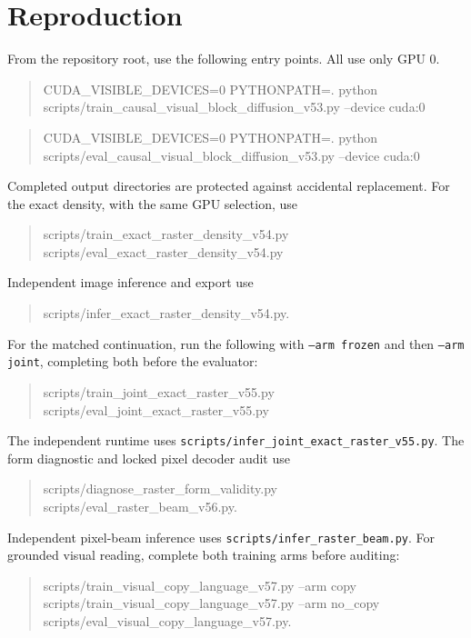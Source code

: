\documentclass[10pt,a4paper]{article}
\begin{document}
\section*{Reproduction}
From the repository root, use the following entry points. All use only GPU 0.
\begin{quote}\small\ttfamily
CUDA\_VISIBLE\_DEVICES=0 PYTHONPATH=. python\\
scripts/train\_causal\_visual\_block\_diffusion\_v53.py --device cuda:0
\end{quote}
\begin{quote}\small\ttfamily
CUDA\_VISIBLE\_DEVICES=0 PYTHONPATH=. python\\
scripts/eval\_causal\_visual\_block\_diffusion\_v53.py --device cuda:0
\end{quote}
Completed output directories are protected against accidental replacement.
For the exact density, with the same GPU selection, use
\begin{quote}\small\ttfamily
scripts/train\_exact\_raster\_density\_v54.py\\
scripts/eval\_exact\_raster\_density\_v54.py
\end{quote}
Independent image inference and export use
\begin{quote}\small\ttfamily
scripts/infer\_exact\_raster\_density\_v54.py.
\end{quote}
For the matched continuation, run the following with \texttt{--arm frozen}
and then \texttt{--arm joint}, completing both before the evaluator:
\begin{quote}\small\ttfamily
scripts/train\_joint\_exact\_raster\_v55.py\\
scripts/eval\_joint\_exact\_raster\_v55.py
\end{quote}
The independent runtime uses
\texttt{scripts/infer\_joint\_exact\_raster\_v55.py}.
The form diagnostic and locked pixel decoder audit use
\begin{quote}\small\ttfamily
scripts/diagnose\_raster\_form\_validity.py\\
scripts/eval\_raster\_beam\_v56.py.
\end{quote}
Independent pixel-beam inference uses
\texttt{scripts/infer\_raster\_beam.py}.
For grounded visual reading, complete both training arms before auditing:
\begin{quote}\small\ttfamily
scripts/train\_visual\_copy\_language\_v57.py --arm copy\\
scripts/train\_visual\_copy\_language\_v57.py --arm no\_copy\\
scripts/eval\_visual\_copy\_language\_v57.py.
\end{quote}
\end{document}
